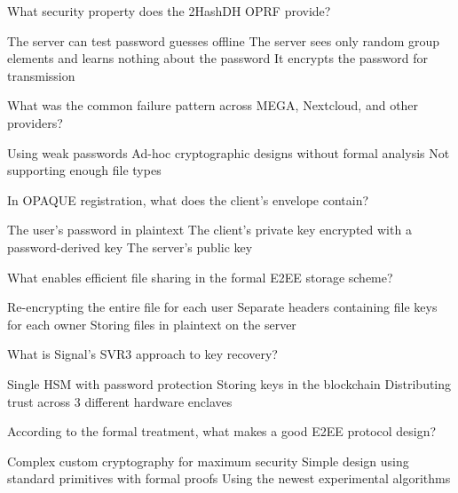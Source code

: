 \documentclass[10pt,a4paper,american]{exam}
\begin{document}
\begin{questions}
	\question What security property does the 2HashDH OPRF provide?
	\begin{randomizechoices}
		\choice The server can test password guesses offline
		\CorrectChoice The server sees only random group elements and learns nothing about the password
		\choice It encrypts the password for transmission
	\end{randomizechoices}

	\question What was the common failure pattern across MEGA, Nextcloud, and other providers?
	\begin{randomizechoices}
		\choice Using weak passwords
		\CorrectChoice Ad-hoc cryptographic designs without formal analysis
		\choice Not supporting enough file types
	\end{randomizechoices}

	\question In OPAQUE registration, what does the client's envelope contain?
	\begin{randomizechoices}
		\choice The user's password in plaintext
		\CorrectChoice The client's private key encrypted with a password-derived key
		\choice The server's public key
	\end{randomizechoices}

	\question What enables efficient file sharing in the formal E2EE storage scheme?
	\begin{randomizechoices}
		\choice Re-encrypting the entire file for each user
		\CorrectChoice Separate headers containing file keys for each owner
		\choice Storing files in plaintext on the server
	\end{randomizechoices}

	\question What is Signal's SVR3 approach to key recovery?
	\begin{randomizechoices}
		\choice Single HSM with password protection
		\choice Storing keys in the blockchain
		\CorrectChoice Distributing trust across 3 different hardware enclaves
	\end{randomizechoices}

	\question According to the formal treatment, what makes a good E2EE protocol design?
	\begin{randomizechoices}
		\choice Complex custom cryptography for maximum security
		\CorrectChoice Simple design using standard primitives with formal proofs
		\choice Using the newest experimental algorithms
	\end{randomizechoices}

\end{questions}

\clearpage

\end{document}
